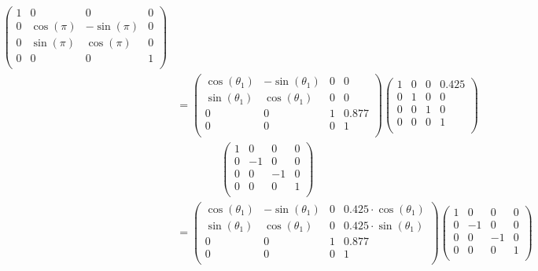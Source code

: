 \documentclass[a4paper,11pt]{article}
\begin{document}
\begin {enumerate}
\begin{enumerate}
\begin{align*}
\begin{pmatrix}
        	    1 & 0 & 0 & 0\\
        		0 & \cos(\pi) & -\sin(\pi) & 0\\
        		0 & \sin(\pi) & \cos(\pi) & 0\\
        		0 & 0 & 0 & 1\\
        	\end{pmatrix}\\
        	&= \begin{pmatrix}
        		\cos(\theta_1) & -\sin(\theta_1) & 0 & 0\\
        		\sin(\theta_1) & \cos(\theta_1) & 0 & 0\\
        		0 & 0 & 1 & 0.877\\
        		0 & 0 & 0 & 1\\
        	\end{pmatrix}
        	\begin{pmatrix}
        		1 & 0 & 0 & 0.425\\
        		0 & 1 & 0 & 0\\
        		0 & 0 & 1 & 0\\
        		0 & 0 & 0 & 1\\
        	\end{pmatrix}\\
        	&\qquad\qquad \begin{pmatrix}
        	    1 & 0 & 0 & 0\\
        		0 & -1 & 0 & 0\\
        		0 & 0 & -1 & 0\\
        		0 & 0 & 0 & 1\\
        	\end{pmatrix}\\
        	&= \begin{pmatrix}
        		\cos(\theta_1) & -\sin(\theta_1) & 0 & 0.425 \cdot \cos(\theta_1)\\
        		\sin(\theta_1) & \cos(\theta_1) & 0 & 0.425 \cdot \sin(\theta_1)\\
        		0 & 0 & 1 & 0.877\\
        		0 & 0 & 0 & 1\\
        	\end{pmatrix}
        	\begin{pmatrix}
        	    1 & 0 & 0 & 0\\
        		0 & -1 & 0 & 0\\
        		0 & 0 & -1 & 0\\
        		0 & 0 & 0 & 1\\
        	\end{pmatrix}\\

\end{align*}
\end{enumerate}
\end{enumerate}
\end{document}
